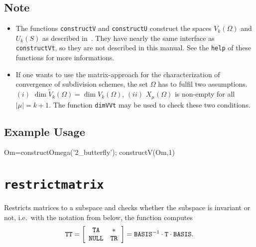 \subsection*{Note}
\begin{itemize}
    \item The functions \texttt{constructV} and \texttt{constructU} construct the spaces ${V}_k(\Omega)$ and $U_k(S)$ as described in~\cite{CM18}. They have nearly the same interface as \texttt{constructVt}, so they are not described in this manual. See the \texttt{help} of these functions for more informations.
    
    \item If one wants to use the matrix-approach for the characterization of convergence of subdivision schemes, the set $\Omega$ has to fulfil two assumptions. $(i)$ $\dim \tilde{V}_k(\Omega)=\dim V_k(\Omega)$, $(ii)$ $X_\mu(\Omega)$ is non-empty for all $|\mu|=k+1$. The function \texttt{dimVVt} may be used to check these two conditions.    
    
\end{itemize}

\subsection*{Example Usage}
\begin{param}
    \item[{Om=constructOmega('2\_butterfly'); constructV(Om,1)}]
\end{param}
%
%
%

\section{\texttt{restrictmatrix}}
Restricts matrices to a subspace and checks whether the subspace is invariant or not, 
i.e.\ with the notation from below, the function computes 
\begin{equation}
\texttt{TT}=
\left[\begin{array}{c c}\texttt{TA}&\ast\\\texttt{NULL}&\texttt{TR}\end{array}\right]=
\texttt{BASIS}^{-1}\cdot\texttt{T}\cdot\texttt{BASIS}.
\end{equation}
